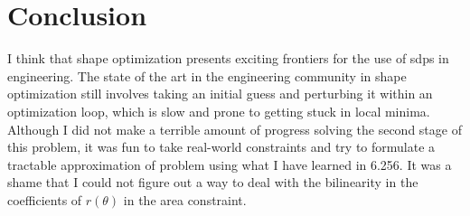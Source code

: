 \section{Conclusion}

I think that shape optimization presents exciting frontiers for the use of \gls{sdp}s in engineering.
The state of the art in the engineering community in shape optimization still involves
taking an initial guess and perturbing it within an optimization loop, which is slow and
prone to getting stuck in local minima. Although I did not make a terrible amount of progress solving
the second stage of this
problem, it was fun to take real-world constraints
and try to formulate a tractable approximation of problem using what I have learned in 6.256.
It was a shame that I could not figure out a way to deal with the bilinearity in the
coefficients of $r(\theta)$ in the area constraint.
